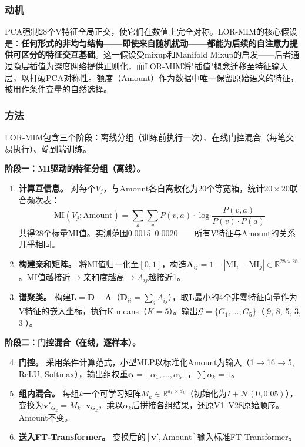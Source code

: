 \subsubsection{动机}

PCA强制28个V特征全局正交，使它们在数值上完全对称。LOR-MIM的核心假设是：\textbf{任何形式的非均匀结构——即使来自随机扰动——都能为后续的自注意力提供可区分的特征交互基础}。这一假设受mixup\cite{zhang2018mixup}和Manifold Mixup\cite{verma2019manifold}的启发——后者通过隐层插值为深度网络提供正则化，而LOR-MIM将"插值"概念迁移至特征输入层，以打破PCA对称性。额度（Amount）作为数据中唯一保留原始语义的特征，被用作条件变量的自然选择。

\subsubsection{方法}

LOR-MIM包含三个阶段：离线分组（训练前执行一次）、在线门控混合（每笔交易执行）、端到端训练。

\smallskip
\noindent\textbf{阶段一：MI驱动的特征分组（离线）。}
\begin{enumerate}
    \item \textbf{计算互信息。} 对每个$V_j$，与Amount各自离散化为20个等宽箱，统计$20\times 20$联合频次表\cite{kraskov2004estimating}：
    \[
    \mathrm{MI}(V_j; \mathrm{Amount}) = \sum_{a} \sum_{v} P(v,a) \cdot \log\frac{P(v,a)}{P(v) \cdot P(a)}
    \]
    共得28个标量MI值\cite{peng2005feature}。实测范围0.0015--0.0020——所有V特征与Amount的关系几乎相同。
    \item \textbf{构建亲和矩阵。} 将MI值归一化至$[0,1]$，构造$\mathbf{A}_{ij} = 1 - |\mathrm{MI}_i - \mathrm{MI}_j| \in \mathbb{R}^{28 \times 28}$。MI值越接近$\to$亲和度越高$\to A_{ij}$越接近1。
    \item \textbf{谱聚类。} 构建$\mathbf{L} = \mathbf{D} - \mathbf{A}$（$\mathbf{D}_{ii} = \sum_j A_{ij}$），取$\mathbf{L}$最小的4个非零特征向量作为V特征的嵌入坐标，执行K-means（$K{=}5$）\cite{ng2001spectral}。输出$\mathcal{G} = \{G_1, \dots, G_5\}$（[9, 8, 5, 3, 3]）。
\end{enumerate}

\smallskip
\noindent\textbf{阶段二：门控混合（在线，逐样本）。}
\begin{enumerate}
    \setcounter{enumi}{3}
    \item \textbf{门控。} 采用条件计算范式\cite{han2021dynamic}，小型MLP以标准化Amount为输入（1$\to$16$\to$5, ReLU, Softmax），输出组权重$\boldsymbol{\alpha} = [\alpha_1,\dots,\alpha_5]$，$\sum\alpha_k=1$。
    \item \textbf{组内混合。} 每组$k$一个可学习矩阵$M_k \in \mathbb{R}^{d_k \times d_k}$（初始化为$I + \mathcal{N}(0,0.05)$），变换为$\mathbf{v}'_{G_k} = M_k \cdot \mathbf{v}_{G_k}$，乘以$\alpha_k$后拼接各组结果，还原V1--V28原始顺序。Amount不变。
    \item \textbf{送入FT-Transformer。} 变换后的$[\mathbf{v}', \mathrm{Amount}]$输入标准FT-Transformer。
\end{enumerate}

